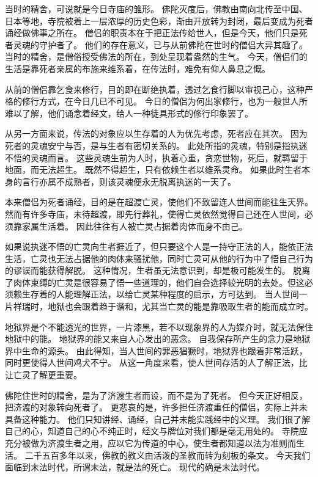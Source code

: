\documentclass[twoside,openany]{book}
\begin{document}
当时的精舍，可说就是今日寺庙的雏形。
佛陀灭度后，佛教由南向北传至中国、日本等地，寺院被着上一层浓厚的历史色彩，渐由开放转为封闭，最后变成为死者诵经做佛事之所在。
僧侣的职责本在于把正法传给世人，但是今天，他们只是死者灵魂的守护者了。
他们的存在意义，已与从前佛陀在世时的僧侣大异其趣了。
当时的精舍，是僧俗授受佛法的所在，到处呈现着盎然的生气。
今天，僧侣们的生活是靠死者亲属的布施来维系着，在传法时，难免有仰人鼻息之慨。

从前的僧侣靠乞食来修行，目的即在断绝执着，透过乞食行脚以审视己心，这种严格的修行方式，在今日几已不可见。
今日的僧侣为何出家修行，也为一般世人所难以了解，他们诵念着经文，给人一种徒具形式的修行印象罢了。

从另一方面来说，传法的对象应以生存着的人为优先考虑，死者应在其次。
因为死者的灵魂安宁与否，是与生者有密切关系的。
此处所指的灵魂，特别是指执迷不悟的灵魂而言。
这些灵魂生前为人时，执着心重，贪恋世物，死后，就羁留于地面，而无法超生。
既然不得超生，只有依赖生者以维系灵命。
如果此时生者本身的言行亦属不成熟者，则该灵魂便永无脱离执迷的一天了。

本来僧侣为死者诵经，目的是在超渡亡灵，使他们不致留连人世间而能往生天界。
然而有许多寺庙，未待超渡，即先行葬礼，使得亡灵依然觉得自己还在人世间，必须靠家属生活着。
因此往往有人被亡灵占据着肉体而身不由己。

如果说执迷不悟的亡灵向生者捱近了，但只要这个人是一持守正法的人，能依正法生活，亡灵也无法占据他的肉体来骚扰他，同时亡灵可从他的行为中了悟自己行为的谬误而能获得解脱。
这种情况，生者虽无法意识到，却是极可能发生的。
脱离了肉体束缚的亡灵是很容易了悟一些道理的，他们自会选择较光明的去处。但这必须赖生存着的人能理解正法，以给亡灵某种程度的启示，方可达到。
当人世间一片祥瑞时，地狱也会跟着趋于谐和，尤其当亡灵的能是靠吸取生者的能而成立时。

地狱界是个不能透光的世界，一片漆黑，若不以现象界的人为媒介时，就无法保住地狱中的能。
地狱界的能又来自人心发出的恶念。
自我保存所产生的念力是地狱界中生命的源头。
由此得知，当人世间的罪恶猖獗时，地狱界也跟着非常活跃，同时更使得人世间鸡犬不宁。
从这一角度来看，使人世间存活的人了解正法，比让亡灵了解更重要。

佛陀住世时的精舍，是为了济渡生者而设，而不是为了死者。
但今天正好相反，把济渡的对象转向死者了。
更悲哀的是，许多担任济渡重任的僧侣，实际上并未具备这种能力。
他们只知讲经、诵经，自己并未能实践经中的义理。
我们很了解自己的心，知道自己的心不纯正时，经文与牌位对我们都是毫无用处的。
寺院应充分被做为济渡生者之用，应以它为传道的中心，使生者都知道以法为准则而生活。
二千五百多年以来，佛教的教义由活泼的圣教而转为刻板的条文。
今天我们面临到末法时代，所谓末法，就是法的死亡。
现代的确是末法时代。
\end{document}
